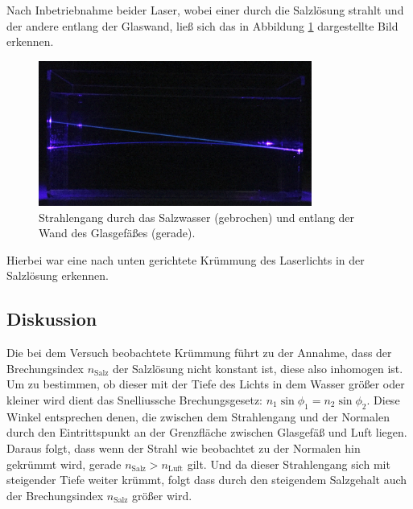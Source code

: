 		Nach Inbetriebnahme beider Laser, wobei einer durch die Salzlösung strahlt und der andere entlang der Glaswand, ließ sich das in Abbildung \ref{fig:Beobachtung1} dargestellte Bild erkennen.
		\begin{figure}[ht]
			\centering
			\includegraphics[width=0.8\textwidth]{bilder/beobachtung1.jpg}
			\caption{Strahlengang durch das Salzwasser (gebrochen) und entlang der Wand des Glasgefäßes (gerade).\cite{WWU}}
			\label{fig:Beobachtung1}	
		\end{figure}
		Hierbei war eine nach unten gerichtete Krümmung des Laserlichts in der Salzlösung erkennen. 
		
	\subsection{Diskussion}
		
		Die bei dem Versuch beobachtete Krümmung führt zu der Annahme, dass der Brechungsindex  $n_\text{Salz}$ der Salzlösung nicht konstant ist, diese also inhomogen ist.
		Um zu bestimmen, ob dieser mit der Tiefe des Lichts in dem Wasser größer oder kleiner wird dient das Snelliussche Brechungsgesetz: $n_1\sin{\phi_1} = n_2\sin{\phi_2}$.
		Diese Winkel entsprechen denen, die zwischen dem Strahlengang und der Normalen durch den Eintrittspunkt an der Grenzfläche zwischen Glasgefäß und Luft liegen.
		Daraus folgt, dass wenn der Strahl wie beobachtet zu der Normalen hin gekrümmt wird, gerade $n_\text{Salz} > n_\text{Luft}$ gilt.
		Und da dieser Strahlengang sich mit steigender Tiefe weiter krümmt, folgt dass durch den steigendem Salzgehalt auch der Brechungsindex $n_\text{Salz}$ größer wird.
